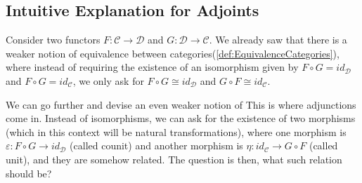 \subsection{Intuitive Explanation for Adjoints}

Consider two functors $F:\mathcal C \to \mathcal D$ and $G:\mathcal D \to \mathcal C$.
We already saw that there is a weaker notion
of equivalence between categories(\ref{def:EquivalenceCategories}), where instead of
requiring the existence of an isomorphism given by
$F \circ G = id_\mathcal D$ and $F \circ G = id_\mathcal C$, we only
ask for $F \circ G \cong id_\mathcal D$ and $G \circ F \cong id_\mathcal C$.

We can go further and devise an even weaker notion of
This is where adjunctions come in. Instead
of isomorphisms, we can ask for the existence of two morphisms
(which in this context will be natural transformations),
where one morphism is $\varepsilon:F\circ G \to id_\mathcal D$ (called counit) and another morphism
is $\eta:id_\mathcal C \to G\circ F $ (called unit), and they are somehow related. The question is
then, what such relation should be?





